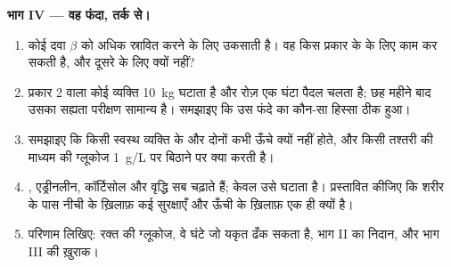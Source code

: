 \begin{problem}
\medskip
\noindent\textbf{भाग IV --- वह फंदा, तर्क से।}
\begin{enumerate}[resume]
  \item कोई दवा $\beta$  को अधिक  स्रावित करने के लिए
        उकसाती है। वह किस प्रकार के  के लिए काम कर सकती है, और
        दूसरे के लिए क्यों नहीं?
  \item प्रकार 2 वाला कोई व्यक्ति \qty{10}{kg} घटाता है और रोज़ एक घंटा
        पैदल चलता है; छह महीने बाद उसका सह्यता परीक्षण सामान्य है।
        समझाइए कि उस फंदे का कौन-सा हिस्सा ठीक हुआ।
  \item समझाइए कि किसी स्वस्थ व्यक्ति के  और  दोनों कभी
        ऊँचे क्यों नहीं होते, और किसी तश्तरी की  माध्यम की ग्लूकोज
        \qty{1}{g/L} पर बिठाने पर क्या करती है।
  \item {}, एड्रीनलीन, कॉर्टिसोल और वृद्धि  सब 
        चढ़ाते हैं; केवल  उसे घटाता है। प्रस्तावित कीजिए कि शरीर के
        पास नीची  के ख़िलाफ़ कई सुरक्षाएँ और ऊँची के ख़िलाफ़
        एक ही क्यों है।
  \item परिणाम लिखिए: रक्त की ग्लूकोज, वे घंटे जो यकृत ढँक सकता है, भाग II
        का निदान, और भाग III की ख़ुराक।
\end{enumerate}
\end{problem}
